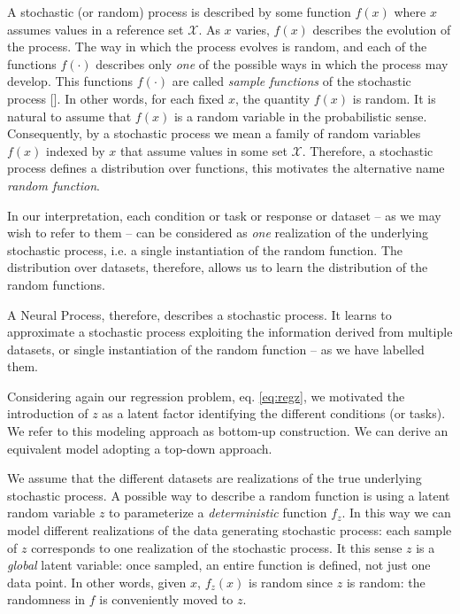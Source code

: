 A stochastic (or random) process is described by some function $f(x)$ where $x$ assumes values in a reference set $\mathcal{X}$. As $x$ varies, $f(x)$ describes the evolution of the process. The way in which the process evolves is random, and each of the functions $f(\cdot)$ describes only \textit{one} of the possible ways in which the process may develop. This functions $f(\cdot)$ are called \textit{sample functions} of the stochastic process [\cite{GikhmanSkorokhod1969}]. In other words, for each fixed $x$, the quantity $f(x)$ is random. It is natural to assume that $f(x)$ is a random variable in the probabilistic sense. Consequently, by a stochastic process we mean a family of random variables $f(x)$ indexed by $x$ that assume values in some set $\mathcal{X}$. Therefore, a stochastic process defines a distribution over functions, this motivates the alternative name \textit{random function}.

In our interpretation, each condition or task or response or dataset -- as we may wish to refer to them -- can be considered as \textit{one} realization of the underlying stochastic process, i.e. a single instantiation of the random function. The distribution over datasets, therefore, allows us to learn the distribution of the random functions. 

A Neural Process, therefore, describes a stochastic process. It learns to approximate a stochastic process exploiting the information derived from multiple datasets, or single instantiation of the random function -- as we have labelled them. 

Considering again our regression problem, eq. \eqref{eq:regz}, we motivated the introduction of $z$ as a latent factor identifying the different conditions (or tasks). We refer to this modeling approach as bottom-up construction. We can derive an equivalent model adopting a top-down approach. 

We assume that the different datasets are realizations of the true underlying stochastic process. A possible way to describe a random function is using a latent random variable $z$ to parameterize a \textit{deterministic} function $f_z$. In this way we can model different realizations of the data generating stochastic process: each sample of $z$ corresponds to one realization of the stochastic process. It this sense $z$ is a \textit{global} latent variable: once sampled, an entire function is defined, not just one data point. In other words, given $x$, $f_z(x)$ is random since $z$ is random: the randomness in $f$ is conveniently moved to $z$.

